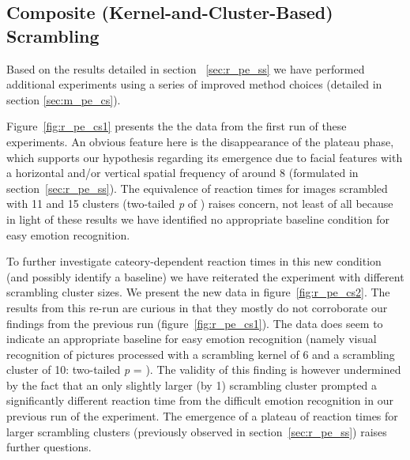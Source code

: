 	\subsection{Composite (Kernel-and-Cluster-Based) Scrambling}\label{sec:r_pe_cs}
	    Based on the results detailed in section ~\ref{sec:r_pe_ss} we have performed additional experiments using a series of improved method choices (detailed in section \ref{sec:m_pe_cs}).
	    
	    Figure~\ref{fig:r_pe_cs1} presents the the data from the first run of these experiments.
	    An obvious feature here is the disappearance of the plateau phase, which supports our hypothesis regarding its emergence due to facial features with a horizontal and/or vertical spatial frequency of around \SI{8}{\pixel} (formulated in section~\ref{sec:r_pe_ss}).
	    The equivalence of reaction times for images scrambled with \SI{11}{\pixel} and \SI{15}{\pixel} clusters (two-tailed \textit{p} of ) raises concern, not least of all because in light of these results we have identified no appropriate baseline condition for easy emotion recognition.
	    
	    To further investigate cateory-dependent reaction times in this new condition (and possibly identify a baseline) we have reiterated the experiment with different scrambling cluster sizes.
	    We present the new data in figure~\ref{fig:r_pe_cs2}.
	    The results from this re-run are curious in that they mostly do not corroborate our findings from the previous run (figure~\ref{fig:r_pe_cs1}).
	    The data does seem to indicate an appropriate baseline for easy emotion recognition (namely visual recognition of pictures processed with a scrambling kernel of \SI{6}{\pixel} and a scrambling cluster of \SI{10}{\pixel}: two-tailed \textit{p} = ).
	    The validity of this finding is however undermined by the fact that an only slightly larger (by \SI{1}{\pixel}) scrambling cluster prompted a significantly different reaction time from the difficult emotion recognition in our previous run of the experiment.
	    The emergence of a plateau of reaction times for larger scrambling clusters (previously observed in section~\ref{sec:r_pe_ss}) raises further questions.
	    
